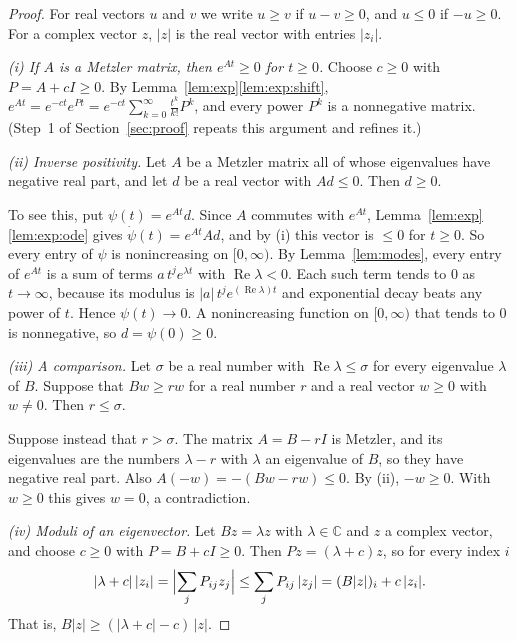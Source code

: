\documentclass[11pt]{article}
\theoremstyle{definition}
\theoremstyle{remark}
\newcommand{\C}{\mathbb{C}}
\renewcommand{\Re}{\operatorname{Re}}
\begin{document}
\begin{proof}
For real vectors $u$ and $v$ we write $u \ge v$ if $u - v \ge 0$, and $u \le 0$ if $-u \ge 0$. For
a complex vector $z$, $|z|$ is the real vector with entries $|z_i|$.

\emph{\textup{(i)} If $A$ is a Metzler matrix, then $e^{At} \ge 0$ for $t \ge 0$.} Choose
$c \ge 0$ with $P = A + cI \ge 0$. By Lemma~\ref{lem:exp}\ref{lem:exp:shift},
$e^{At} = e^{-ct} e^{Pt} = e^{-ct} \sum_{k=0}^{\infty} \frac{t^{k}}{k!} P^{k}$, and every power
$P^{k}$ is a nonnegative matrix. (Step~1 of Section~\ref{sec:proof} repeats this argument and
refines it.)

\emph{\textup{(ii)} Inverse positivity.} Let $A$ be a Metzler matrix all of whose eigenvalues have
negative real part, and let $d$ be a real vector with $Ad \le 0$. Then $d \ge 0$.

To see this, put $\psi(t) = e^{At} d$. Since $A$ commutes with $e^{At}$,
Lemma~\ref{lem:exp}\ref{lem:exp:ode} gives $\dot{\psi}(t) = e^{At} A d$, and by (i) this vector is
$\le 0$ for $t \ge 0$. So every entry of $\psi$ is nonincreasing on $[0, \infty)$. By
Lemma~\ref{lem:modes}, every entry of $e^{At}$ is a sum of terms $a\, t^{j} e^{\lambda t}$ with
$\Re\lambda < 0$. Each such term tends to $0$ as $t \to \infty$, because its modulus is
$|a|\, t^{j} e^{(\Re\lambda) t}$ and exponential decay beats any power of $t$. Hence
$\psi(t) \to 0$. A nonincreasing function on $[0, \infty)$ that tends to $0$ is nonnegative, so
$d = \psi(0) \ge 0$.

\emph{\textup{(iii)} A comparison.} Let $\sigma$ be a real number with $\Re\lambda \le \sigma$ for
every eigenvalue $\lambda$ of $B$. Suppose that $Bw \ge r w$ for a real number $r$ and a real
vector $w \ge 0$ with $w \ne 0$. Then $r \le \sigma$.

Suppose instead that $r > \sigma$. The matrix $A = B - rI$ is Metzler, and its eigenvalues are the
numbers $\lambda - r$ with $\lambda$ an eigenvalue of $B$, so they have negative real part. Also
$A(-w) = -(Bw - rw) \le 0$. By (ii), $-w \ge 0$. With $w \ge 0$ this gives $w = 0$, a
contradiction.

\emph{\textup{(iv)} Moduli of an eigenvector.} Let $Bz = \lambda z$ with $\lambda \in \C$ and $z$
a complex vector, and choose $c \ge 0$ with $P = B + cI \ge 0$. Then $Pz = (\lambda + c) z$, so for
every index $i$
\[
  |\lambda + c|\, |z_i| = \Bigl| \sum_{j} P_{ij} z_j \Bigr| \le \sum_{j} P_{ij}\, |z_j|
  = (B|z|)_i + c\, |z_i| .
\]
That is, $B|z| \ge (|\lambda + c| - c)\, |z|$.


\end{proof}
\end{document}
